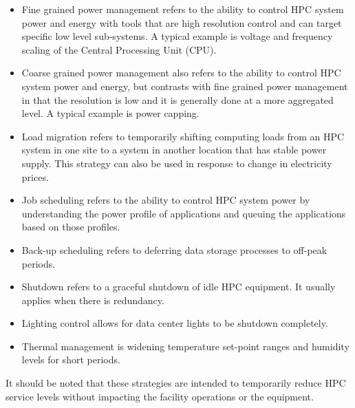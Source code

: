 \begin{itemize}
\item Fine grained power management refers to the ability to control HPC system power 
and energy with tools that are high resolution control and can target specific 
low level sub-systems. A typical example is voltage and frequency scaling of the Central Processing Unit (CPU).

\item Coarse grained power management also refers to the ability to control HPC 
system power and energy, but contrasts with fine grained power management in 
that the resolution is low and it is generally done at a more aggregated level. 
A typical example is power capping.

\item Load migration refers to temporarily shifting computing loads from 
an HPC system in one site to a system in another location that has stable power supply. 
This strategy can also be used in response to change in electricity prices.

\item Job scheduling refers to the ability to control HPC system power 
by understanding the power profile of applications and queuing the 
applications based on those profiles.

\item Back-up scheduling refers to deferring data storage processes to off-peak periods.

\item Shutdown refers to a graceful shutdown of idle HPC equipment. It usually 
applies when there is redundancy.

\item Lighting control allows for data center lights to be shutdown completely.

\item Thermal management is widening temperature set-point ranges and 
humidity levels for short periods.
\end{itemize}

It should be noted that these strategies are intended to temporarily reduce HPC service levels without impacting the facility operations or the equipment.
